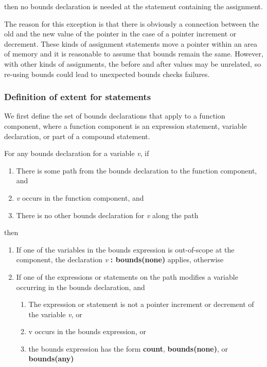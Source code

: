 \documentclass[]{article}
\begin{document}
then no bounds declaration is needed at the statement containing the
assignment.

The reason for this exception is that there is obviously a connection
between the old and the new value of the pointer in the case of a
pointer increment or decrement. These kinds of assignment statements
move a pointer within an area of memory and it is reasonable to assume
that bounds remain the same. However, with other kinds of assignments,
the before and after values may be unrelated, so re-using bounds could
lead to unexpected bounds checks failures.

\subsubsection{\texorpdfstring{\protect\hypertarget{ux5fToc435434939}{}{\protect\hypertarget{ux5fToc437460765}{}{\protect\hypertarget{ux5fToc440445443}{}{\protect\hypertarget{ux5fToc440449225}{}{\protect\hypertarget{ux5fToc440551875}{}{}}}}}Definition
of extent for
statements}{Definition of extent for statements}}\label{definition-of-extent-for-statements}

We first define the set of bounds declarations that apply to a function
component, where a function component is an expression statement,
variable declaration, or part of a compound statement.

For any bounds declaration for a variable \emph{v}, if

\begin{enumerate}
\def\labelenumi{\arabic{enumi}.}
\item
  There is some path from the bounds declaration to the function
  component, and
\item
  \emph{v} occurs in the function component, and
\item
  There is no other bounds declaration for \emph{v} along the path
\end{enumerate}

then

\begin{enumerate}
\def\labelenumi{\arabic{enumi}.}
\item
  If one of the variables in the bounds expression is out-of-scope at
  the component, the declaration \emph{v} \textbf{: bounds(none)}
  applies, otherwise
\item
  If one of the expressions or statements on the path modifies a
  variable occurring in the bounds declaration, and

  \begin{enumerate}
  \def\labelenumii{\alph{enumii}.}
  \item
    The expression or statement is not a pointer increment or decrement
    of the variable \emph{v}, or
  \item
    v occurs in the bounds expression, or
  \item
    the bounds expression has the form \textbf{count},
    \textbf{bounds(none)}, or \textbf{bounds(any)}
  \end{enumerate}
\end{enumerate}
\end{document}
